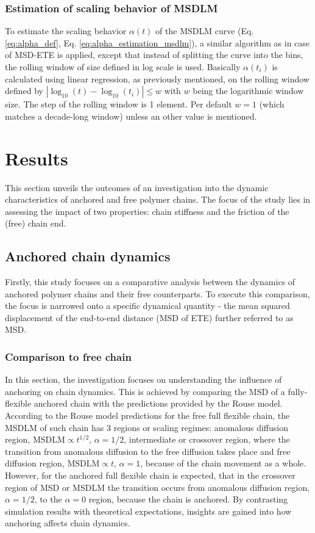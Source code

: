 \documentclass[
    paper=A4,pagesize=automedia,fontsize=12pt,
    BCOR=15mm,DIV=22,
    twoside,headinclude,footinclude=false,
    fleqn,             %
    bibliography=totocnumbered,          %
    listof=totoc,                %
    listof=flat,                 %
    cleardoublepage=empty      %
    numbers=endperiod
]{scrartcl}
\begin{document}
\subsubsection{Estimation of scaling behavior of MSDLM} \label{sec:est-alpha-msdlm}
To estimate the scaling behavior $\alpha(t)$ of the MSDLM curve 
(Eq. \ref{eq:alpha_def}, Eq. \ref{eq:alpha_estimation_msdlm}), a similar
algorithm as in case of MSD-ETE is applied, except that instead of
splitting the curve into the bins, the rolling window of size defined in log scale is used.
Basically $\alpha(t_i)$ is calculated using linear regression, as previously
mentioned, on the rolling window defined by $|\log_{10}(t)-\log_{10}(t_i)| \le w$
with $w$ being the logarithmic window size. The step of the rolling window is 1 element.
Per default $w = 1$ (which matches a decade-long window) 
unless an other value is mentioned.

\section{Results}
This section unveils the outcomes of an investigation into the dynamic
characteristics of anchored and free polymer chains. 
The focus of the study lies in assessing the impact 
of two properties: chain stiffness and the friction of the (free) chain end.

\subsection{Anchored chain dynamics}
Firstly, this study focuses on a comparative analysis between the 
dynamics of anchored polymer chains and their free counterparts.
To execute this comparison, the focus is narrowed onto a specific dynamical
quantity - the mean squared displacement of the end-to-end distance (MSD of ETE)
further referred to as MSD.

\subsubsection{Comparison to free chain} \label{sec:comp_to_free_chain}

In this section, the investigation focuses on understanding 
the influence of anchoring on chain dynamics. 
This is achieved by comparing the MSD of a fully-flexible anchored 
chain with the predictions provided by the Rouse model.
According to the Rouse model predictions for the free full flexible chain, the MSDLM
of such chain has 3 regions or scaling regimes: anomalous diffusion region,
$\text{MSDLM} \propto t^{1/2}$, $\alpha=1/2$, intermediate or crossover region, where the transition
from anomalous diffusion to the free diffusion takes place and free diffusion region, 
$\text{MSDLM} \propto t$, $\alpha=1$, because of the chain movement as a whole. 
However, for the anchored full flexible chain
is expected, that in the crossover region of MSD or MSDLM the transition occurs from 
anomalous diffusion region, $\alpha=1/2$, to the $\alpha=0$ region, because the chain 
is anchored. By contrasting simulation results with theoretical
expectations, insights are gained into how anchoring 
affects chain dynamics.
\end{document}
